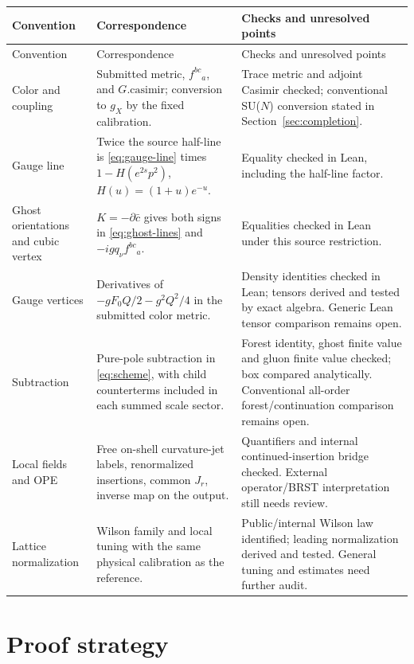 \documentclass[11pt]{article}
\begin{document}
\begingroup\small
\begin{longtable}{@{}>{\raggedright\arraybackslash}p{}>{\raggedright\arraybackslash}p{}>{\raggedright\arraybackslash}p{}@{}}
\toprule
Convention & Correspondence & Checks and unresolved points\\\midrule
\endfirsthead
\toprule Convention & Correspondence & Checks and unresolved points\\\midrule
\endhead
Color and coupling & Submitted metric, $f^{bc}{}_a$, and $G.\mathrm{casimir}$; conversion to $g_X$ by the fixed calibration. & Trace metric and adjoint Casimir checked; conventional SU($N$) conversion stated in Section~\ref{sec:completion}.\\[4pt]
Gauge line & Twice the source half-line is \eqref{eq:gauge-line} times $1-H(e^{2s}p^2)$, $H(u)=(1+u)e^{-u}$. & Equality checked in Lean, including the half-line factor.\\[4pt]
Ghost orientations and cubic vertex & $K=-\partial\bar c$ gives both signs in \eqref{eq:ghost-lines} and $-igq_\nu f^{bc}{}_a$. & Equalities checked in Lean under this source restriction.\\[4pt]
Gauge vertices & Derivatives of $-gF_0Q/2-g^2Q^2/4$ in the submitted color metric. & Density identities checked in Lean; tensors derived and tested by exact algebra. Generic Lean tensor comparison remains open.\\[4pt]
Subtraction & Pure-pole subtraction in \eqref{eq:scheme}, with child counterterms included in each summed scale sector. & Forest identity, ghost finite value and gluon finite value checked; box compared analytically. Conventional all-order forest/continuation comparison remains open.\\[4pt]
Local fields and OPE & Free on-shell curvature-jet labels, renormalized insertions, common $J_r$, inverse map on the output. & Quantifiers and internal continued-insertion bridge checked. External operator/BRST interpretation still needs review.\\[4pt]
Lattice normalization & Wilson family and local tuning with the same physical calibration as the reference. & Public/internal Wilson law identified; leading normalization derived and tested. General tuning and estimates need further audit.\\
\bottomrule
\end{longtable}
\endgroup
\section{Proof strategy}
\label{sec:proof}
\end{document}
